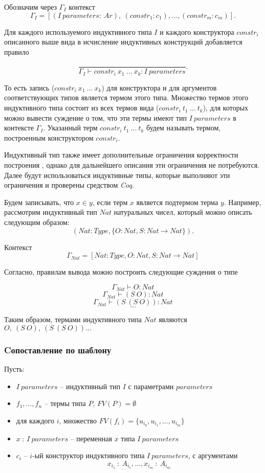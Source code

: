\documentclass[12pt]{article}
\begin{document}
Обозначим через $\Gamma_I$ контекст $$\Gamma_I = [(I\ parameters:\ Ar),\ (constr_1: c_1),...,(constr_m: c_m)].$$

Для каждого используемого индуктивного типа $I$ и каждого конструктора $constr_i$ описанного выше вида в исчисление индуктивных конструкций добавляется правило

$$ \frac{}{\Gamma_I \vdash constr_i\ x_1\ ...\ x_k : I\ parameters}.$$

То есть запись ($constr_i\ x_1\ ...\ x_k$) для конструктора и для аргументов соответствующих типов является термом этого типа.
Множество термов этого индуктивного типа состоит из всех термов вида ($constr_i\ t_1\ ...\ t_k$), для которых можно вывести суждение о том, что эти термы имеют тип $I\ parameters$ в контексте $\Gamma_I$.
Указанный терм $constr_i\ t_1\ ...\ t_k$ будем называть термом, построенным конструктором $constr_i$.

Индуктивный тип также имеет дополнительные ограничения корректности построения \cite{CIC}, однако для дальнейшего описания эти ограничения не потребуются. Далее будут использоваться индуктивные типы, которые выполняют эти ограничения и проверены средством \textit{Coq}.

Будем записывать, что $x \in y$, если терм $x$ является подтермом терма $y$.
Например, рассмотрим индуктивный тип $Nat$ натуральных чисел, который можно описать следующим образом:
$$(Nat:Type, \{O: Nat, S: Nat \xrightarrow{} Nat\}).$$

Контекст $$\Gamma_{Nat} = [Nat:Type, O:Nat, S:Nat \xrightarrow{} Nat] $$

Согласно, правилам вывода можно построить следующие суждения о типе

$$\Gamma_{Nat} \vdash O: Nat$$
$$\Gamma_{Nat} \vdash (S\ O): Nat$$
$$\Gamma_{Nat} \vdash (S\ (S\ O)): Nat$$
$$...$$

Таким образом, термами индуктивного типа $Nat$ являются $O,\ (S\ O),\ (S\ (S\ O))...$ 

\subsubsection{Cопоставление по шаблону}
Пусть:
\begin{itemize}
    \item $I\ parameters$ -- индуктивный тип $I$ с параметрами $parameters$
    \item $f_1,...,f_n$ -- термы типа $P$, $FV(P) = \emptyset $
    \item для каждого $i$, множество $FV(f_i)=\{u_{i_0}, u_{i_1}, ... , u_{i_m}\}$
    \item $x\ :\ I\ parameters$ -- переменная $x$ типа $I\ parameters$
    \item $c_i$ -- $i$-ый конструктор индуктивного типа $I\ parameters$, с аргументами $$x_{i_1}\ :\ A_{i_1}, ..., x_{i_m}\ :\ A_{i_m}$$
\end{itemize}
\end{document}
